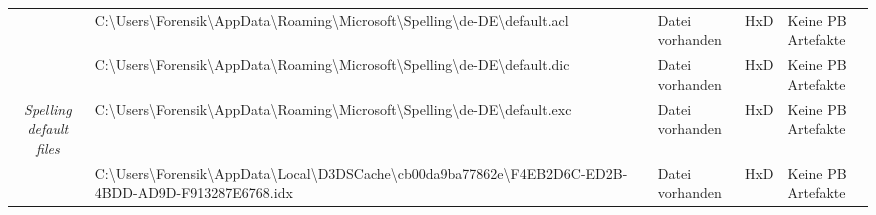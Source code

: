 \begin{appendices}
{\begin{landscape}
\begin{table}[h!]
{\begin{tabular}{cllll}
		\multicolumn{1}{|c|}{}                                                        & \multicolumn{1}{l|}{\cellcolor[HTML]{FE0000}C:\textbackslash{}Users\textbackslash{}Forensik\textbackslash{}AppData\textbackslash{}Roaming\textbackslash{}Microsoft\textbackslash{}Spelling\textbackslash{}de-DE\textbackslash{}default.acl}                                                                                                                                     & \multicolumn{1}{l|}{\cellcolor[HTML]{009901}Datei vorhanden}                                      & \multicolumn{1}{l|}{HxD}                                   & \multicolumn{1}{l|}{\cellcolor[HTML]{F8A102}Keine PB Artefakte} \\ \cline{2-5} 
		\multicolumn{1}{|c|}{}                                                        & \multicolumn{1}{l|}{\cellcolor[HTML]{FE0000}C:\textbackslash{}Users\textbackslash{}Forensik\textbackslash{}AppData\textbackslash{}Roaming\textbackslash{}Microsoft\textbackslash{}Spelling\textbackslash{}de-DE\textbackslash{}default.dic}                                                                                                                                     & \multicolumn{1}{l|}{\cellcolor[HTML]{009901}Datei vorhanden}                                      & \multicolumn{1}{l|}{HxD}                                   & \multicolumn{1}{l|}{\cellcolor[HTML]{F8A102}Keine PB Artefakte} \\ \cline{2-5} 
		\multicolumn{1}{|c|}{\multirow{-3}{*}{\textit{Spelling default files}}}       & \multicolumn{1}{l|}{\cellcolor[HTML]{FE0000}C:\textbackslash{}Users\textbackslash{}Forensik\textbackslash{}AppData\textbackslash{}Roaming\textbackslash{}Microsoft\textbackslash{}Spelling\textbackslash{}de-DE\textbackslash{}default.exc}                                                                                                                                     & \multicolumn{1}{l|}{\cellcolor[HTML]{009901}Datei vorhanden}                                      & \multicolumn{1}{l|}{HxD}                                   & \multicolumn{1}{l|}{\cellcolor[HTML]{F8A102}Keine PB Artefakte} \\ \hline
		\multicolumn{1}{|c|}{}                                                        & \multicolumn{1}{l|}{\cellcolor[HTML]{FE0000}C:\textbackslash{}Users\textbackslash{}Forensik\textbackslash{}AppData\textbackslash{}Local\textbackslash{}D3DSCache\textbackslash{}cb00da9ba77862e\textbackslash{}F4EB2D6C-ED2B-4BDD-AD9D-F913287E6768.idx}                                                                                                                        & \multicolumn{1}{l|}{\cellcolor[HTML]{009901}Datei vorhanden}                                      & \multicolumn{1}{l|}{HxD}                                   & \multicolumn{1}{l|}{\cellcolor[HTML]{F8A102}Keine PB Artefakte} \\ \cline{2-5} 

\end{tabular}}
\end{table}
\end{landscape}}
\end{appendices}
